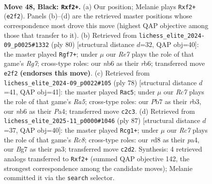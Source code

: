 \documentclass[11pt]{article}
\begin{document}
\clearpage

\begin{figure}[p]\centering
\begin{subfigure}{0.46\textwidth}\centering
\resizebox{\linewidth}{!}{%
\newchessgame
\chessboard[
  setfen={3R4/1p4bk/1N4p1/5p1p/P7/5KPP/2r1rP2/8 b - - 12 48},
  showmover=false,
  pgfstyle=straightmove, color=movearrow, markmove={e2-f2}
]}
\caption{}
\end{subfigure}\hfill
\begin{subfigure}{0.46\textwidth}\centering
\resizebox{\linewidth}{!}{%
\newchessgame
\chessboard[
  setfen={8/R5R1/1r3k2/5pp1/7p/2P2P1P/6PK/2r5 w - - 7 41},
  showmover=false,
  pgfstyle=straightmove, color=movearrow, markmove={g7-f7}
]}
\caption{}
\end{subfigure}
\\[4pt]
\begin{subfigure}{0.46\textwidth}\centering
\resizebox{\linewidth}{!}{%
\newchessgame
\chessboard[
  setfen={8/4p2p/3n1kp1/R3R3/P5PP/1r3P2/5K2/8 w - - 3 40},
  showmover=false,
  pgfstyle=straightmove, color=movearrow, markmove={a5-c5}
]}
\caption{}
\end{subfigure}\hfill
\begin{subfigure}{0.46\textwidth}\centering
\resizebox{\linewidth}{!}{%
\newchessgame
\chessboard[
  setfen={8/6p1/7k/5P2/P2N2Pp/P6P/1R4K1/2r4r b - - 4 44},
  showmover=false,
  pgfstyle=straightmove, color=movearrow, markmove={c1-g1}
]}
\caption{}
\end{subfigure}
\caption{\textbf{Move 48, Black: \texttt{Rxf2+}.} (a) Our position; Melanie plays \texttt{Rxf2+} (\texttt{e2f2}). Panels (b)--(d) are the retrieved master positions whose correspondence most drove this move (highest QAP objective among those that transfer to it). (b) Retrieved from \texttt{lichess\_elite\_2024-09\_p0025\#1332} (ply 80) [structural distance $d$=32, QAP obj=40]: the master played \texttt{Rgf7+}; under $\mu$ our \emph{Re7} plays the role of that game's \emph{Rg7}; cross-type roles: our \emph{n}b6 as their \emph{r}b6; transferred move \texttt{e2f2} \textbf{(endorses this move)}. (c) Retrieved from \texttt{lichess\_elite\_2024-09\_p0022\#105} (ply 78) [structural distance $d$=41, QAP obj=41]: the master played \texttt{Rac5}; under $\mu$ our \emph{Rc7} plays the role of that game's \emph{Ra5}; cross-type roles: our \emph{P}b7 as their \emph{r}b3, our \emph{n}b6 as their \emph{P}a4; transferred move \texttt{c2c3}. (d) Retrieved from \texttt{lichess\_elite\_2025-11\_p0000\#1046} (ply 87) [structural distance $d$=37, QAP obj=40]: the master played \texttt{Rcg1+}; under $\mu$ our \emph{Rc7} plays the role of that game's \emph{Rc8}; cross-type roles: our \emph{r}d8 as their \emph{p}a4, our \emph{B}g7 as their \emph{p}a3; transferred move \texttt{c2d2}. Synthesis: 4 retrieved analogs transferred to \texttt{Rxf2+} (summed QAP objective 142, the strongest correspondence among the candidate moves); Melanie committed it via the \texttt{search} selector.}
\label{fig:thought-m95}
\end{figure}
\end{document}
